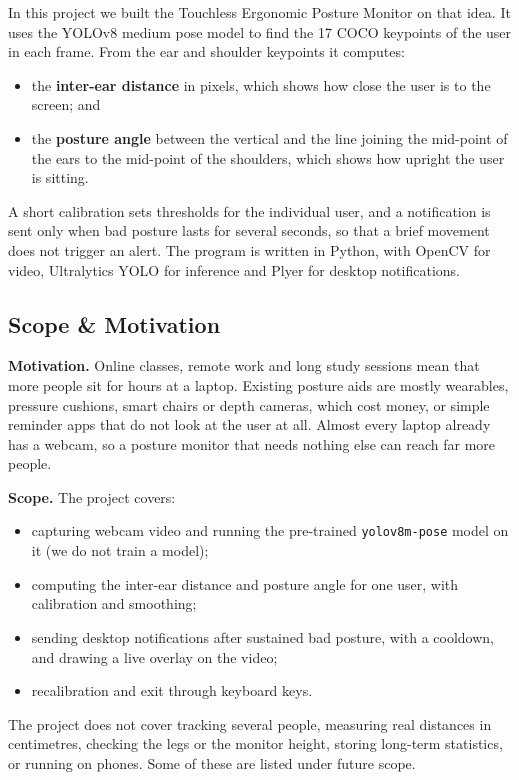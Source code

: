 ﻿\documentclass[12pt,a4paper]{article}
\begin{document}
In this project we built the Touchless Ergonomic Posture Monitor on that idea. It uses the
YOLOv8 medium pose model \cite{ultralytics} to find the 17 COCO keypoints \cite{cocodataset}
of the user in each frame. From the ear and shoulder keypoints it computes:
\begin{itemize}
    \item the \textbf{inter-ear distance} in pixels, which shows how close the user is to
          the screen; and
    \item the \textbf{posture angle} between the vertical and the line joining the
          mid-point of the ears to the mid-point of the shoulders, which shows how upright
          the user is sitting.
\end{itemize}
A short calibration sets thresholds for the individual user, and a notification is sent only
when bad posture lasts for several seconds, so that a brief movement does not trigger an
alert. The program is written in Python, with OpenCV for video, Ultralytics YOLO for
inference and Plyer for desktop notifications.

\subsection{Scope \& Motivation}
\textbf{Motivation.} Online classes, remote work and long study sessions mean that more
people sit for hours at a laptop. Existing posture aids are mostly wearables, pressure
cushions, smart chairs or depth cameras, which cost money, or simple reminder apps that do
not look at the user at all. Almost every laptop already has a webcam, so a posture monitor
that needs nothing else can reach far more people.

\textbf{Scope.} The project covers:
\begin{itemize}
    \item capturing webcam video and running the pre-trained \texttt{yolov8m-pose} model
          on it (we do not train a model);
    \item computing the inter-ear distance and posture angle for one user, with
          calibration and smoothing;
    \item sending desktop notifications after sustained bad posture, with a cooldown, and
          drawing a live overlay on the video;
    \item recalibration and exit through keyboard keys.
\end{itemize}
The project does not cover tracking several people, measuring real distances in
centimetres, checking the legs or the monitor height, storing long-term statistics, or
running on phones. Some of these are listed under future scope.
\end{document}
